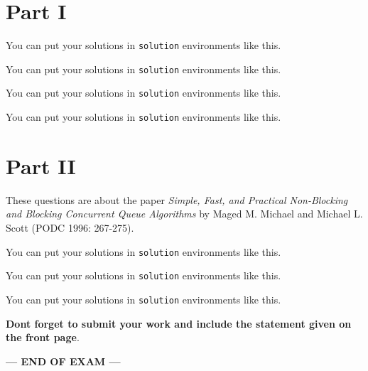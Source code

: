 \documentclass[a4paper,answers]{exam}
\begin{document}

\begin{questions}

\section*{Part I}

\question[x]
\lipsum[1-1]

\begin{solution}
  You can put your solutions in \verb!solution! environments like this.
\end{solution}

\question[x]
\lipsum[1-1]

\begin{solution}
  You can put your solutions in \verb!solution! environments like this.
\end{solution}

\question[x]
\lipsum[1-1]

\begin{solution}
  You can put your solutions in \verb!solution! environments like this.
\end{solution}

\question[x]
\lipsum[1-1]

\begin{solution}
  You can put your solutions in \verb!solution! environments like this.
\end{solution}

\FloatBarrier
\section*{Part II}

These questions are about the paper \emph{Simple, Fast, and Practical Non-Blocking and Blocking Concurrent Queue Algorithms} by Maged M. Michael and Michael L. Scott (PODC 1996: 267-275).

\question[x]
\lipsum[1-1]

\begin{solution}
  You can put your solutions in \verb!solution! environments like this.
\end{solution}

\question[x]
\lipsum[1-1]

\begin{solution}
  You can put your solutions in \verb!solution! environments like this.
\end{solution}

\question[x]
\lipsum[1-1]

\begin{solution}
  You can put your solutions in \verb!solution! environments like this.
\end{solution}

\end{questions}

\textbf{Dont forget to submit your work and include the statement given on the front page}.\\

\centerline{\bf \large --- END OF EXAM ---}
\end{document}
